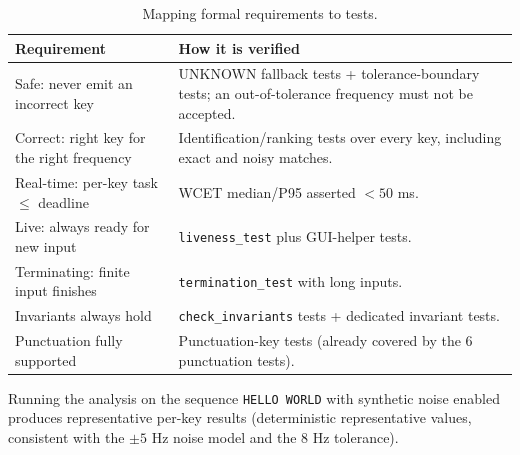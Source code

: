 \documentclass[11pt,a4paper]{article}
\newcommand{\Key}[1]{\texttt{#1}}
\begin{document}
\begin{table}[H]
    \centering
    \begin{tabular}{@{}p{6cm}p{8cm}@{}}
        \toprule
        \textbf{Requirement} & \textbf{How it is verified} \\
        \midrule
        Safe: never emit an incorrect key &
        UNKNOWN fallback tests + tolerance-boundary tests; an out-of-tolerance
        frequency must not be accepted. \\
        Correct: right key for the right frequency &
        Identification/ranking tests over every key, including exact and
        noisy matches. \\
        Real-time: per-key task $\le$ deadline &
        WCET median/P95 asserted $< 50$ ms. \\
        Live: always ready for new input &
        \texttt{liveness\_test} plus GUI-helper tests. \\
        Terminating: finite input finishes &
        \texttt{termination\_test} with long inputs. \\
        Invariants always hold &
        \texttt{check\_invariants} tests + dedicated invariant tests. \\
        Punctuation fully supported &
        Punctuation-key tests (already covered by the 6 punctuation tests). \\
        \bottomrule
    \end{tabular}
    \caption{Mapping formal requirements to tests.}
    \label{tab:trace}
\end{table}

Running the analysis on the sequence \Key{HELLO WORLD} with synthetic noise
enabled produces representative per-key results (deterministic representative
values, consistent with the $\pm 5$ Hz noise model and the 8 Hz tolerance).
\end{document}
